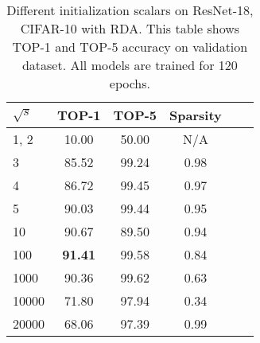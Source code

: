 \begin{table}[tb]
	\caption{Different initialization scalars on ResNet-18, CIFAR-10 with RDA. This table shows TOP-1 and TOP-5 accuracy on validation dataset. All models are trained for 120 epochs.}
	\label{table:ini_CIFAR10}
	\vskip 0.15in
	\begin{center}
		\begin{small}
				\begin{tabular}{lccccr}
					\hline
					$\sqrt{s}$ &  TOP-1 &  TOP-5 &  Sparsity\\
					\hline
					1, 2    &  10.00 &  50.00 &  N/A      \\
					3      &  85.52 &  99.24 &  0.98    \\
					4      &  86.72 &  99.45 &  0.97     \\
					5      &  90.03 &  99.44 &  0.95     \\
					10     &  90.67 &  89.50 &  0.94    \\
					100    &  \bf 91.41 &  99.58 &  0.84 \\
					1000   &  90.36 &  99.62 &  0.63 \\
					10000  &  71.80 &  97.94 &  0.34 \\
					20000  &  68.06 &  97.39 &  0.99 \\
					\hline
				\end{tabular}
		\end{small}
	\end{center}		
\end{table}

